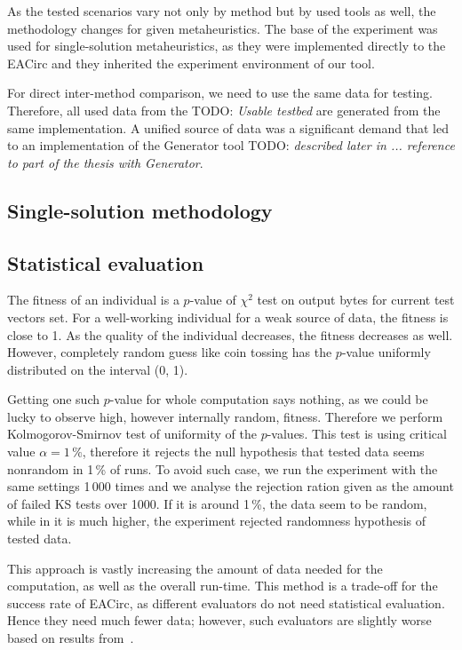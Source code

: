 \documentclass[
  print, %
  Table,   %
  nolof,     %
  nolot,     %
  11pt, %
  oneside  %
]{fithesis3}
\newcommand{\todo}[1]{TODO: \textit{#1}}
\begin{document}
As the tested scenarios vary not only by method but by used tools as well, the methodology changes for given metaheuristics. The base of the experiment was used for single-solution metaheuristics, as they were implemented directly to the EACirc and they inherited the experiment environment of our tool.

For direct inter-method comparison, we need to use the same data for testing. Therefore, all used data from the \todo{Usable testbed} are generated from the same implementation. A unified source of data was a significant demand that led to an implementation of the Generator tool \todo{described later in ... reference to part of the thesis with Generator}.

\subsection{Single-solution methodology}

\subsection{Statistical evaluation}

The fitness of an individual is a $p$-value of $\chi^{2}$ test on output bytes for current test vectors set. For a well-working individual for a weak source of data, the fitness is close to 1. As the quality of the individual decreases, the fitness decreases as well. However, completely random guess like coin tossing has the $p$-value uniformly distributed on the interval (0, 1).

Getting one such $p$-value for whole computation says nothing, as we could be lucky to observe high, however internally random, fitness. Therefore we perform Kolmogorov-Smirnov test of uniformity of the $p$-values. This test is using critical value $\alpha = 1\,\%$, therefore it rejects the null hypothesis that tested data seems nonrandom in 1\,\% of runs. To avoid such case, we run the experiment with the same settings 1\,000 times and we analyse the rejection ration given as the amount of failed KS tests over 1000. If it is around 1\,\%, the data seem to be random, while in it is much higher, the experiment rejected randomness hypothesis of tested data.

This approach is vastly increasing the amount of data needed for the computation, as well as the overall run-time. This method is a trade-off for the success rate of EACirc, as different evaluators do not need statistical evaluation. Hence they need much fewer data; however, such evaluators are slightly worse based on results from~\cite{svenda2013towards}.
\end{document}
